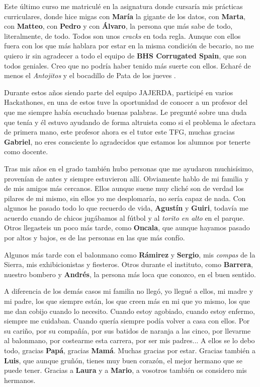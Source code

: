 \documentclass[12pt,a4paper,twoside,openright]{book}
\begin{document}
\begin{umaacknowledgments}
    Este último curso me matriculé en la asignatura donde cursaría mis prácticas curriculares, donde hice migas con \textbf{María} la gigante de los datos, con \textbf{Marta}, con \textbf{Matteo}, con \textbf{Pedro} y con \textbf{Álvaro}, la persona que más sabe de todo, literalmente, de todo. Todos son unos \textit{cracks} en toda regla. Aunque con ellos fuera con los que más hablara por estar en la misma condición de becario, no me quiero ir sin agradecer a todo el equipo de \textbf{BHS Corrugated Spain}, que son todos geniales. Creo que no podría haber tenido más suerte con ellos. Echaré de menos el \textit{Antojitos} y el bocadillo de Pata de los jueves .

    Durante estos años siendo parte del equipo JAJERDA, participé en varios Hackathones, en una de estos tuve la oportunidad de conocer a un profesor del que me siempre había escuchado buenas palabras. Le pregunté sobre una duda que tenía y él estuvo ayudando de forma altruista como si el problema le afectara de primera mano, este profesor ahora es el tutor este TFG, muchas gracias \textbf{Gabriel}, no eres consciente lo agradecidos que estamos los alumnos por tenerte como docente.

    Tras mis años en el grado también hubo personas que me ayudaron muchisísimo, provenían de antes y siempre estuvieron allí. Obviamente hablo de mi familia y de mis amigos más cercanos. Ellos aunque suene muy cliché son de verdad los pilares de mi mismo, sin ellos yo me desplomaría, no sería capaz de nada.
    Con algunos he pasado todo lo que recuerdo de vida, \textbf{Agustín} y \textbf{Guiri}, todavía me acuerdo cuando de chicos jugábamos al fútbol y al \textit{torito en alto} en el parque. Otros llegasteis un poco más tarde, como \textbf{Oncala}, que aunque hayamos pasado por altos y bajos, es de las personas en las que más confío.
    
    Algunos más tarde con el balonmano como \textbf{Rámirez} y \textbf{Sergio}, mis \textit{compas} de la Sierra, mis exhibicionistas y fiesteros. Otros durante el instituto, como \textbf{Barrera}, nuestro bombero y \textbf{Andrés}, la persona más loca que conozco, en el buen sentido.

    A diferencia de los demás casos mi familia no llegó, yo llegué a ellos, mi madre y mi padre, los que siempre están, los que creen más en mi que yo mismo, los que me dan cobijo cuando lo necesito. Cuando estoy agobiado, cuando estoy enfermo, siempre me cuidaban. Cuando quería siempre podía volver a casa con ellos. Por su cariño, por su compañía, por sus batidos de naranja a las cinco, por llevarme al balonmano, por costearme esta carrera, por ser mis padres... A ellos se lo debo todo, gracias \textbf{Papá}, gracias \textbf{Mamá}. Muchas gracias por estar. Gracias también a \textbf{Luis}, que aunque gruñón, tienes muy buen corazón, el mejor hermano que se puede tener. Gracias a \textbf{Laura} y a \textbf{Mario}, a vosotros también os considero mis hermanos.


\end{umaacknowledgments}
\end{document}

